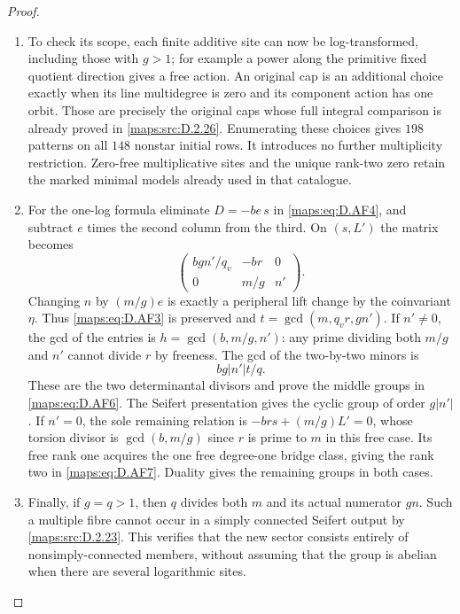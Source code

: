 \begin{proof}
\begin{enumerate}[label=\arabic*.,leftmargin=*]
\item To check its scope, each finite additive site can now be
log-transformed, including those with $g>1$; for example a
power along the primitive fixed quotient direction gives a
free action. An original cap is an additional choice exactly
when its line multidegree is zero and its component action
has one orbit. Those are precisely the original caps whose
full integral comparison is already proved in \ref{maps:src:D.2.26}.
Enumerating these choices gives $198$ patterns on all $148$
nonstar initial rows. It introduces no further multiplicity
restriction. Zero-free multiplicative sites and the unique
rank-two zero retain the marked minimal models already used
in that catalogue.

\item For the one-log formula eliminate $D=-be\,s$ in \eqref{maps:eq:D.AF4},
and subtract $e$ times the second column from the third.
On $(s,L')$ the matrix becomes
\[
 \begin{pmatrix}
  bgn'/q_v&-br&0\\
  0&m/g&n'
 \end{pmatrix}.                                            \tag{D.AF9}\label{maps:eq:D.AF9}
\]
Changing $n$ by $(m/g)e$ is exactly a peripheral lift change
by the coinvariant $\eta$. Thus \eqref{maps:eq:D.AF3} is preserved and
$t=\gcd(m,q_vr,gn')$. If $n'\ne0$, the gcd of the entries is
$h=\gcd(b,m/g,n')$: any prime dividing both $m/g$ and $n'$
cannot divide $r$ by freeness. The gcd of the two-by-two
minors is
\[
 bg|n'|t/q.
\]
These are the two determinantal divisors and prove the
middle groups in \eqref{maps:eq:D.AF6}. The Seifert presentation gives the
cyclic group of order $g|n'|$. If $n'=0$, the sole remaining
relation is $-brs+(m/g)L'=0$, whose torsion divisor is
$\gcd(b,m/g)$ since $r$ is prime to $m$ in this free case.
Its free rank one acquires the one free degree-one bridge
class, giving the rank two in \eqref{maps:eq:D.AF7}. Duality gives the
remaining groups in both cases.

\item Finally, if $g=q>1$, then $q$ divides both $m$ and its actual
numerator $gn$. Such a multiple fibre cannot occur in a
simply connected Seifert output by \ref{maps:src:D.2.23}. This verifies
that the new sector consists entirely of nonsimply-connected
members, without assuming that the group is abelian when
there are several logarithmic sites.
\end{enumerate}
\end{proof}

